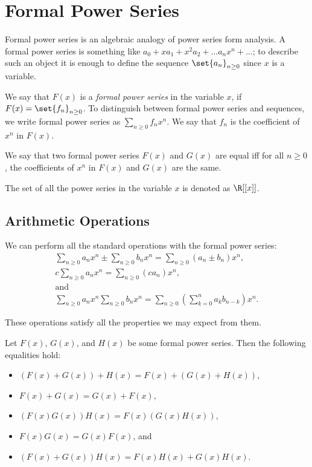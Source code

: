\chapter{Formal Power Series}
\label{chapter:formal-power-series}
Formal power series is an algebraic analogy of power series form analysis.
A formal power series is something like
$a_0 + x a_1 + x^2 a_2 + \dots a_n x^n + \dots$; to describe such an object it
is enough to define the sequence $\set{a_n}_{n \ge 0}$ since $x$ is a variable.
\begin{definition}
  We say that $F(x)$ is a \emph{formal power series} in the variable $x$, if
  $F(x) = \set{f_n}_{n \ge 0}$. To distinguish between formal power series and
  sequences, we write formal power series as $\sum_{n \ge 0} f_n x^n$.
  We say that $f_n$ is the coefficient of $x^n$ in $F(x)$.

  We say that two formal power series $F(x)$ and $G(x)$ are equal iff for all
  $n \ge  0$, the coefficients of $x^n$ in $F(x)$ and $G(x)$ are the same.

  The set of all the power series in the variable $x$ is denoted as
  $\R[[x]]$.
\end{definition}

\section{Arithmetic Operations}

We can perform all the standard operations with the formal power series:
\begin{gather*}
  \sum_{n \ge 0} a_n x^n \pm \sum_{n \ge 0} b_n x^n =
  \sum_{n \ge 0} (a_n \pm b_n) x^n, \\
  c \sum_{n \ge 0} a_n x^n =
  \sum_{n \ge 0} (c a_n) x^n,
  \\
  \text{and} \\
  \sum_{n \ge 0} a_n x^n \sum_{n \ge 0} b_n x^n =
  \sum_{n \ge 0} (\sum_{k = 0}^n a_{k} b_{n - k}) x^n.
\end{gather*}

These operations satisfy all the properties we may expect from them.
\begin{theorem}
  Let $F(x)$, $G(x)$, and $H(x)$ be some formal power series. Then the following
  equalities hold:
  \begin{itemize}
    \item $(F(x) + G(x)) + H(x) = F(x) + (G(x) + H(x))$,
    \item $F(x) + G(x) = G(x) + F(x)$,
    \item $(F(x) G(x)) H(x) = F(x) (G(x) H(x))$,
    \item $F(x) G(x) = G(x) F(x)$, and
    \item $(F(x) + G(x)) H(x) = F(x)H(x) + G(x)H(x)$.
  \end{itemize}
\end{theorem}


